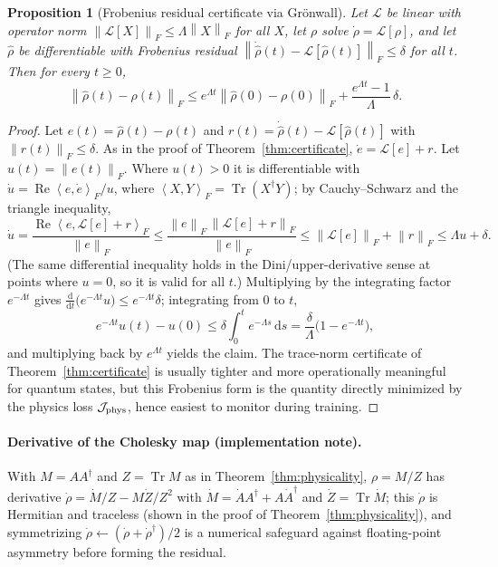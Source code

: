 \documentclass[11pt]{article}
\newtheorem{proposition}[theorem]{Proposition}
\DeclareMathOperator{\Tr}{Tr}
\newcommand{\calJ}{\mathcal{J}}
\newcommand{\calL}{\mathcal{L}}
\newcommand{\dd}{\mathrm{d}}
\newcommand{\norm}[1]{\left\lVert #1 \right\rVert}
\newcommand{\ip}[2]{\left\langle #1,#2 \right\rangle}
\newcommand{\rhohat}{\widehat{\rho}}
\begin{document}
\begin{proposition}[Frobenius residual certificate via Gr\"onwall]
\label{prop:frobenius_certificate}
Let $\calL$ be linear with operator norm $\norm{\calL[X]}_F\le\Lambda\norm{X}_F$ for all $X$, let $\rho$ solve $\dot\rho=\calL[\rho]$, and let $\rhohat$ be differentiable with Frobenius residual $\norm{\dot\rhohat(t)-\calL[\rhohat(t)]}_F\le\delta$ for all $t$. Then for every $t\ge0$,
\[
\norm{\rhohat(t)-\rho(t)}_F\le e^{\Lambda t}\norm{\rhohat(0)-\rho(0)}_F+\frac{e^{\Lambda t}-1}{\Lambda}\,\delta.
\]
\end{proposition}
\begin{proof}
Let $e(t)=\rhohat(t)-\rho(t)$ and $r(t)=\dot\rhohat(t)-\calL[\rhohat(t)]$ with $\norm{r(t)}_F\le\delta$. As in the proof of Theorem~\ref{thm:certificate}, $\dot e=\calL[e]+r$. Let $u(t)=\norm{e(t)}_F$. Where $u(t)>0$ it is differentiable with $\dot u=\operatorname{Re}\ip{e}{\dot e}_F/u$, where $\ip{X}{Y}_F=\Tr(X^\dagger Y)$; by Cauchy--Schwarz and the triangle inequality,
\[
\dot u=\frac{\operatorname{Re}\ip{e}{\calL[e]+r}_F}{\norm{e}_F}\le\frac{\norm{e}_F\,\norm{\calL[e]+r}_F}{\norm{e}_F}\le\norm{\calL[e]}_F+\norm{r}_F\le\Lambda u+\delta.
\]
(The same differential inequality holds in the Dini/upper-derivative sense at points where $u=0$, so it is valid for all $t$.) Multiplying by the integrating factor $e^{-\Lambda t}$ gives $\tfrac{\dd}{\dd t}\big(e^{-\Lambda t}u\big)\le e^{-\Lambda t}\delta$; integrating from $0$ to $t$,
\[
e^{-\Lambda t}u(t)-u(0)\le\delta\int_0^t e^{-\Lambda s}\,\dd s=\frac{\delta}{\Lambda}\big(1-e^{-\Lambda t}\big),
\]
and multiplying back by $e^{\Lambda t}$ yields the claim. The trace-norm certificate of Theorem~\ref{thm:certificate} is usually tighter and more operationally meaningful for quantum states, but this Frobenius form is the quantity directly minimized by the physics loss $\calJ_{\rm phys}$, hence easiest to monitor during training.
\end{proof}

\paragraph{Derivative of the Cholesky map (implementation note).}
With $M=AA^\dagger$ and $Z=\Tr M$ as in Theorem~\ref{thm:physicality}, $\rho=M/Z$ has derivative $\dot\rho=\dot M/Z-M\dot Z/Z^2$ with $\dot M=\dot A A^\dagger+A\dot A^\dagger$ and $\dot Z=\Tr\dot M$; this $\dot\rho$ is Hermitian and traceless (shown in the proof of Theorem~\ref{thm:physicality}), and symmetrizing $\dot\rho\leftarrow(\dot\rho+\dot\rho^\dagger)/2$ is a numerical safeguard against floating-point asymmetry before forming the residual.
\end{document}

